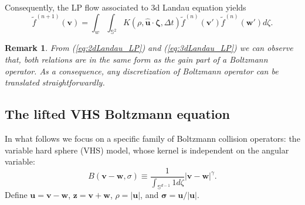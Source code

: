 \documentclass{article}
\newtheorem{remark}{Remark}
\numberwithin{equation}{section}
\begin{document}
Consequently, the LP flow associated to 3d Landau equation yields
\begin{equation}\label{eq:3dLandau_LP}
    \widetilde{f}^{(n+1)} (\mathbf{v}) = \int_{w}\int_{\mathbb{S}^{2}} K(\rho,\widehat{\mathbf{u}}\cdot \mathbf{\zeta},\Delta t)\widetilde{f}^{(n)}(\mathbf{v}') \widetilde{f}^{(n)}(\mathbf{w}') d\zeta.
\end{equation}




\bigskip
\begin{remark}
    From (\ref{eq:2dLandau_LP}) and (\ref{eq:3dLandau_LP}) we can observe that, both relations are in the same form as the gain part of a Boltzmann operator. As a consequence, any discretization of Boltzmann operator can be translated straightforwardly.
\end{remark}



\subsection{The lifted VHS Boltzmann equation}
In what follows we focus on a specific family of Boltzmann collision operators: the variable hard sphere (VHS) model, whose kernel is independent on the angular variable:
\begin{equation*}
    B(\mathbf{v}-\mathbf{w},\sigma) \equiv \frac{1}{\int_{\mathbb{S}^{d-1}}1d\zeta}\left\vert\mathbf{v}-\mathbf{w}\right\vert^{\gamma}.
\end{equation*}
Define $\mathbf{u} = \mathbf{v} - \mathbf{w}$, $\mathbf{z} = \mathbf{v} + \mathbf{w}$, $\rho = |\mathbf{u}|$, and $\mathbf{\sigma} = \mathbf{u}/|\mathbf{u}|$. 
\end{document}
